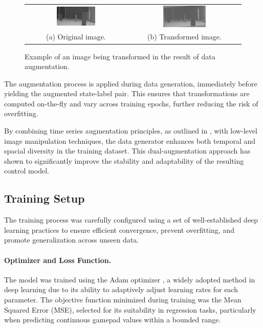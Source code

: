 \begin{figure}[htbp]
  \centering
  \begin{tabu}{cc}
    \includegraphics[width=0.4\textwidth]{Images/Augmentation/original.png} & \includegraphics[width=0.4\textwidth]{Images/Augmentation/transformed.png} \\
    \parbox{0.4\textwidth}{\centering (a) Original image.} &
    \parbox{0.4\textwidth}{\centering (b) Transformed image.}
  \end{tabu}
  \caption{Example of an image being transformed in the result of data augmentation.}
  \label{fig:augmentation_transformations}
\end{figure}

The augmentation process is applied during data generation, immediately before yielding the augmented state-label pair. This ensures that transformations are computed on-the-fly and vary across training epochs, further reducing the risk of overfitting.

By combining time series augmentation principles, as outlined in \autocite{iglesias2023data}, with low-level image manipulation techniques, the data generator enhances both temporal and spacial diversity in the training dataset. This dual-augmentation approach has shown to significantly improve the stability and adaptability of the resulting control model.

\subsection{Training Setup}
\label{sec:trainingsetup}

The training process was carefully configured using a set of well-established deep learning practices to ensure efficient convergence, prevent overfitting, and promote generalization across unseen data.

\paragraph{Optimizer and Loss Function.}
The model was trained using the Adam optimizer \autocite{kingma2015adam}, a widely adopted method in deep learning due to its ability to adaptively adjust learning rates for each parameter. The objective function minimized during training was the Mean Squared Error (MSE), selected for its suitability in regression tasks, particularly when predicting continuous gamepad values within a bounded range.

